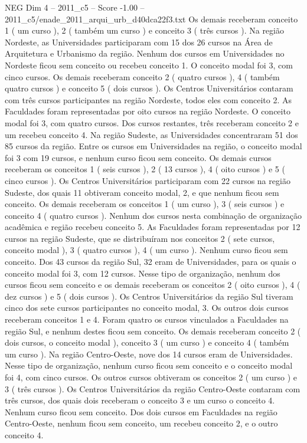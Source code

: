 \begin{textsample}{NEG Dim 4 – 2011\_c5 – Score -1.00 – 2011\_c5/enade\_2011\_arqui\_urb\_d40dca22f3.txt}
Os demais receberam conceito 1 ( um curso ), 2 ( também um curso ) e conceito 3 ( três cursos ).
Na região Nordeste, as Universidades participaram com 15 dos 26 cursos na Área de Arquitetura e Urbanismo da região.
Nenhum dos cursos em Universidades no Nordeste ficou sem conceito ou recebeu conceito 1.
O conceito modal foi 3, com cinco cursos.
Os demais receberam conceito 2 ( quatro cursos ), 4 ( também quatro cursos ) e conceito 5 ( dois cursos ).
Os Centros Universitários contaram com três cursos participantes na região Nordeste, todos eles com conceito 2.
As Faculdades foram representadas por oito cursos na região Nordeste.
O conceito modal foi 3, com quatro cursos.
Dos cursos restantes, três receberam conceito 2 e um recebeu conceito 4.
Na região Sudeste, as Universidades concentraram 51 dos 85 cursos da região.
Entre os cursos em Universidades na região, o conceito modal foi 3 com 19 cursos, e nenhum curso ficou sem conceito.
Os demais cursos receberam os conceitos 1 ( seis cursos ), 2 ( 13 cursos ), 4 ( oito cursos ) e 5 ( cinco cursos ).
Os Centros Universitários participaram com 22 cursos na região Sudeste, dos quais 11 obtiveram conceito modal, 2, e que nenhum ficou sem conceito.
Os demais receberam os conceitos 1 ( um curso ), 3 ( seis cursos ) e conceito 4 ( quatro cursos ).
Nenhum dos cursos nesta combinação de organização acadêmica e região recebeu conceito 5.
As Faculdades foram representadas por 12 cursos na região Sudeste, que se distribuíram nos conceitos 2 ( sete cursos, conceito modal ), 3 ( quatro cursos ), 4 ( um curso ).
Nenhum curso ficou sem conceito.
Dos 43 cursos da região Sul, 32 eram de Universidades, para os quais o conceito modal foi 3, com 12 cursos.
Nesse tipo de organização, nenhum dos cursos ficou sem conceito e os demais receberam os conceitos 2 ( oito cursos ), 4 ( dez cursos ) e 5 ( dois cursos ).
Os Centros Universitários da região Sul tiveram cinco dos sete cursos participantes no conceito modal, 3.
Os outros dois cursos receberam conceitos 1 e 4.
Foram quatro os cursos vinculados a Faculdades na região Sul, e nenhum destes ficou sem conceito.
Os demais receberam conceito 2 ( dois cursos, o conceito modal ), conceito 3 ( um curso ) e conceito 4 ( também um curso ).
Na região Centro-Oeste, nove dos 14 cursos eram de Universidades.
Nesse tipo de organização, nenhum curso ficou sem conceito e o conceito modal foi 4, com cinco cursos.
Os outros cursos obtiveram os conceitos 2 ( um curso ) e 3 ( três cursos ).
Os Centros Universitários da região Centro-Oeste contaram com três cursos, dos quais dois receberam o conceito 3 e um curso o conceito 4.
Nenhum curso ficou sem conceito.
Dos dois cursos em Faculdades na região Centro-Oeste, nenhum ficou sem conceito, um recebeu conceito 2, e o outro conceito 4.

\end{textsample}

